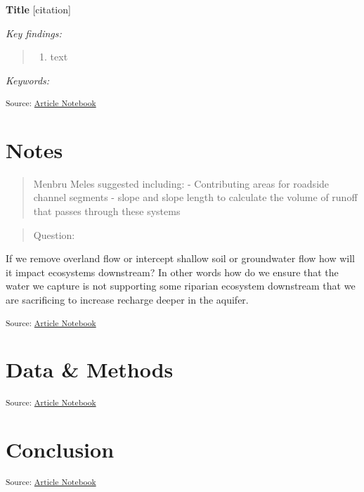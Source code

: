 \documentclass[
]{agujournal2019}
\providecommand{\tightlist}{%
  \setlength{\itemsep}{0pt}\setlength{\parskip}{0pt}}\usepackage{longtable,booktabs,array}
\begin{document}
\textbf{Title} {[}citation{]}

\emph{Key findings:}

\begin{quote}
\begin{enumerate}
\def\labelenumi{\arabic{enumi}.}
\tightlist
\item
  text
\end{enumerate}
\end{quote}

\emph{Keywords:}

\textsubscript{Source:
\href{https://Ryan3Lima.github.io/ATUR-ORE/index.ipynb.html}{Article
Notebook}}

\section{Notes}\label{notes}

\begin{quote}
Menbru Meles suggested including: - Contributing areas for roadside
channel segments - slope and slope length to calculate the volume of
runoff that passes through these systems
\end{quote}

\begin{quote}
Question:
\end{quote}

If we remove overland flow or intercept shallow soil or groundwater flow
how will it impact ecosystems downstream? In other words how do we
ensure that the water we capture is not supporting some riparian
ecosystem downstream that we are sacrificing to increase recharge deeper
in the aquifer.

\textsubscript{Source:
\href{https://Ryan3Lima.github.io/ATUR-ORE/index.ipynb.html}{Article
Notebook}}

\section{Data \& Methods}\label{sec-data-methods}

\textsubscript{Source:
\href{https://Ryan3Lima.github.io/ATUR-ORE/index.ipynb.html}{Article
Notebook}}

\section{Conclusion}\label{sec-conclusions}

\textsubscript{Source:
\href{https://Ryan3Lima.github.io/ATUR-ORE/index.ipynb.html}{Article
Notebook}}
\end{document}
